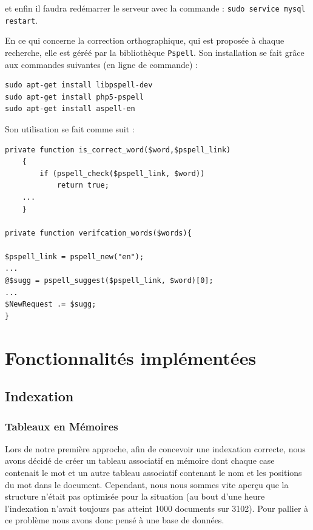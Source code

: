 \documentclass[11pt,a4paper]{article}
\begin{document}
et enfin il faudra redémarrer le serveur avec la commande : \verb|sudo service mysql restart|.
 

\newpage

En ce qui concerne la correction orthographique, qui est proposée à chaque recherche, elle est géréé par la bibliothèque \verb|Pspell|.
Son installation se fait grâce aux commandes suivantes (en ligne de commande) :

\begin{lstlisting}
sudo apt-get install libpspell-dev 
sudo apt-get install php5-pspell
sudo apt-get install aspell-en
\end{lstlisting}

Son utilisation se fait comme suit : 

\begin{lstlisting}
private function is_correct_word($word,$pspell_link)
    {
        if (pspell_check($pspell_link, $word))
            return true;
	...
    }

private function verifcation_words($words){

$pspell_link = pspell_new("en");
...
@$sugg = pspell_suggest($pspell_link, $word)[0];
...
$NewRequest .= $sugg;
}
\end{lstlisting}





\newpage
\section{Fonctionnalités implémentées}
\subsection{Indexation}
\subsubsection{Tableaux en Mémoires}
Lors de notre première approche, afin de concevoir une indexation correcte, nous avons décidé de créer un tableau associatif en mémoire dont chaque case contenait le mot et un autre tableau associatif contenant le nom et les positions du mot dans le document.
\medbreak
Cependant, nous nous sommes vite aperçu que la structure n'était pas optimisée pour la situation (au bout d'une heure l'indexation n'avait toujours pas atteint 1000 documents sur 3102). Pour pallier à ce problème nous avons donc pensé à une base de données.
\end{document}
